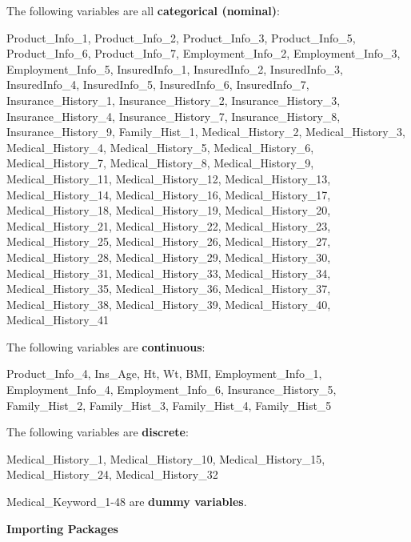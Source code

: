 \documentclass[11pt]{article}
\begin{document}
The following variables are all \textbf{categorical (nominal)}:

Product\_Info\_1, Product\_Info\_2, Product\_Info\_3, Product\_Info\_5,
Product\_Info\_6, Product\_Info\_7, Employment\_Info\_2,
Employment\_Info\_3, Employment\_Info\_5, InsuredInfo\_1,
InsuredInfo\_2, InsuredInfo\_3, InsuredInfo\_4, InsuredInfo\_5,
InsuredInfo\_6, InsuredInfo\_7, Insurance\_History\_1,
Insurance\_History\_2, Insurance\_History\_3, Insurance\_History\_4,
Insurance\_History\_7, Insurance\_History\_8, Insurance\_History\_9,
Family\_Hist\_1, Medical\_History\_2, Medical\_History\_3,
Medical\_History\_4, Medical\_History\_5, Medical\_History\_6,
Medical\_History\_7, Medical\_History\_8, Medical\_History\_9,
Medical\_History\_11, Medical\_History\_12, Medical\_History\_13,
Medical\_History\_14, Medical\_History\_16, Medical\_History\_17,
Medical\_History\_18, Medical\_History\_19, Medical\_History\_20,
Medical\_History\_21, Medical\_History\_22, Medical\_History\_23,
Medical\_History\_25, Medical\_History\_26, Medical\_History\_27,
Medical\_History\_28, Medical\_History\_29, Medical\_History\_30,
Medical\_History\_31, Medical\_History\_33, Medical\_History\_34,
Medical\_History\_35, Medical\_History\_36, Medical\_History\_37,
Medical\_History\_38, Medical\_History\_39, Medical\_History\_40,
Medical\_History\_41

The following variables are \textbf{continuous}:

Product\_Info\_4, Ins\_Age, Ht, Wt, BMI, Employment\_Info\_1,
Employment\_Info\_4, Employment\_Info\_6, Insurance\_History\_5,
Family\_Hist\_2, Family\_Hist\_3, Family\_Hist\_4, Family\_Hist\_5

The following variables are \textbf{discrete}:

Medical\_History\_1, Medical\_History\_10, Medical\_History\_15,
Medical\_History\_24, Medical\_History\_32

Medical\_Keyword\_1-48 are \textbf{dummy variables}.

    \textbf{Importing Packages}
\end{document}
